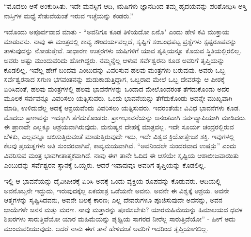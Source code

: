 “ಮೊದಲು ಆಸೆ ಅಂಕುರಿಸಿತು. ಇದೇ ಮನಸ್ಸಿಗೆ ಆದಿ, ಋಷಿಗಳು ಜ್ಞಾನದಿಂದ ತಮ್ಮ ಹೃದಯವನ್ನು ಪರಿಶೋಧಿಸಿ ಅಸ್ತಿ ನಾಸ್ತಿಗಳ ಮಧ್ಯೆ ಸೇತುವೆಯಂತೆ ಇರುವ ಇಚ್ಛೆಯನ್ನು ಕಂಡರು.”

ಇದೊಂದು ಅಪೂರ್ವವಾದ ಮಾತು - “ಅವನಿಗೂ ಕೂಡ ತಿಳಿಯದೋ ಏನೊ" ಎಂದು ಹೇಳಿ ಕವಿ ಮುಕ್ತಾಯ ಮಾಡುವನು. ನಾವು ಈ ಮಂತ್ರದಲ್ಲಿ ಕಾವ್ಯ ಸೌಂದರ್ಯವಲ್ಲದೆ, ಸೃಷ್ಟಿಗೆ ಸಂಬಂಧಪಟ್ಟ ಪ್ರಶ್ನೆಗಳು ಸ್ಪಷ್ಟರೂಪವನ್ನು ತಾಳುವುದನ್ನು ನೋಡುತ್ತೇವೆ. ಸಾಧಾರಣ ಉತ್ತರಗಳು ಋಷಿಗಳಿಗೆ ಯಾವ ತೃಪ್ತಿಯನ್ನೂ ಕೊಡುವ ಸ್ಥಿತಿಯಲ್ಲಿರಲಿಲ್ಲ. ಅವರು ಅಷ್ಟು ಮುಂದುವರಿದು ಹೋಗಿದ್ದರು. ನಮ್ಮನ್ನೆಲ್ಲ ಆಳುವ ಸರ್ವೆಶ್ವರನು ಕೂಡ ಅವರಿಗೆ ತೃಪ್ತಿಯನ್ನು ಕೊಡಲಿಲ್ಲ. ಇವೆಲ್ಲ ಹೇಗೆ ಬಂದವು ಎಂಬುದನ್ನು ವಿವರಿಸುವ ಹಲವು ಮಂತ್ರಗಳು ಬರುವುವು. ಅವರು ಒಬ್ಬ ಸರ್ವೆಶ್ವರನಾದ ಸಗುಣ ಭಗವಂತನನ್ನು ಹುಡುಕಾಡುತ್ತಿದ್ದಾಗ, ಒಬ್ಬರಾದ ಮೇಲೆ ಒಬ್ಬ ದೇವರನ್ನು ಆ ಪೀಠಕ್ಕೆ ಏರಿಸಿದಂತೆ, ಹಲವು ಮಂತ್ರಗಳಲ್ಲಿ ಹಲವು ಭಾವನೆಗಳನ್ನು ಒಂದಾದ ಮೇಲೊಂದರಂತೆ ತೆಗೆದುಕೊಂಡು ಅದರ ಮೂಲಕ ಸರ್ವವನ್ನೂ ವಿವರಿಸಲು ಯತ್ನಿಸುವರು. ಒಂದು ಭಾವನೆಯನ್ನು ತೆಗೆದುಕೊಂಡು ಅದನ್ನೇ ಮುಖ್ಯವಾಗಿ ಮಾಡಿ, ಉಳಿದುವೆಲ್ಲ ಅದಕ್ಕೆ ಆಶ್ರಯವೆಂದು ವಿವರಿಸಲು ಯತ್ನಿಸುವರು. ಇದರಂತೆಯೇ ವಿವಿಧ ಭಾವನೆಗಳು ಕೂಡ. ಮೊದಲು ಪ್ರಾಣವನ್ನು ಇದಕ್ಕಾಗಿ ತೆಗೆದುಕೊಂಡರು. ಪ್ರಾಣಭಾವನೆಯನ್ನು ಅನಂತವಾಗಿ ಸರ್ವವ್ಯಾಪಿಯಾಗಿ ಮಾಡಿದರು. ಈ ಪ್ರಾಣವೇ ಎಲ್ಲಕ್ಕೂ ಆಶ್ರಯವಾಗಿರುವುದು. ಮನುಷ್ಯನ ದೇಹಕ್ಕೆ ಮಾತ್ರವಲ್ಲ. ಇದೇ ಸೂರ್ಯ ಚಂದ್ರರಲ್ಲಿರುವ ಬೆಳಕು, ಎಲ್ಲವನ್ನೂ ಚಲಿಸುತ್ತಿರುವಂತೆ ಮಾಡುತ್ತಿರುವುದೇ ಇದು, ಇದೇ ವಿಶ್ವದ ಕ್ರಿಯೋತ್ತೇಜಕ ಶಕ್ತಿ. ಇವುಗಳಲ್ಲಿ ಕೆಲವು ಪ್ರಯತ್ನಗಳು ಅತಿ ಸುಂದರವಾಗಿವೆ, ಕಾವ್ಯಮಯವಾಗಿವೆ. “ಅವನಿಂದಲೇ ಸುಂದರವಾದ ಉಷಸ್ಸು” ಎಂದು ವಿವರಿಸುವ ಮಂತ್ರ ಭಾವಗೀತಾತ್ಮಕವಾಗಿದೆ. ನಾವು ಈಗ ತಾನೇ ಓದಿದ ಈ ಆಸೆಯೇ ಸೃಷ್ಟಿಯ ಆಶಾಬೀಜವಾಯಿತು ಎಂಬುದನ್ನು ಸರ್ವೆಶ್ವರನ ಸ್ಥಾನಕ್ಕೆ ಒಯ್ದರು. ಆದರೆ ಇವಾವುವೂ ಅವರಿಗೆ ತೃಪ್ತಿಯನ್ನು ಕೊಡಲಿಲ್ಲ.

ಇಲ್ಲಿ ಆ ಭಾವನೆಯನ್ನು ದೈವೀಪೀಠಕ್ಕೆ ಏರಿಸಿ ಅದಕ್ಕೆ ಒಂದು ವ್ಯಕ್ತಿಯ ರೂಪವನ್ನು ಕೊಡುವರು. ಆದಿಯಲ್ಲಿ ಅವನೊಬ್ಬನೇ ಇದ್ದುದು, ಇರುವುದಕ್ಕೆಲ್ಲ ಏಕಮಾತ್ರ ಒಡೆಯನೇ ಅವನು. ಅವನೇ ಈ ವಿಶ್ವಕ್ಕೆ ಆಶ್ರಯ. ಅವನೇ ಆತ್ಮಗಳನ್ನು ಸೃಷ್ಟಿಸಿದವನು, ಅವನೇ ಬಲಕ್ಕೆ ಕಾರಣ; ಎಲ್ಲ ದೇವರುಗಳೂ ಪೂಜಿಸುವುದೇ ಅವನನ್ನು, ಅವನ ಛಾಯೆಗಳೇ ಜನನ ಮತ್ತು ಮರಣ. ನಾವು ಮತ್ತಾರನ್ನು ಪೂಜಿಸಬೇಕು? ಯಾರ\break ಮಹಿಮೆಯನ್ನು ಹಿಮಾಲಯದ ಧವಳ ಶಿಖರಗಳು ಸಾರುತ್ತಿವೆಯೋ ಯಾರ ಮಹಿಮೆಯನ್ನು ಪೃಥ್ವಿಯ ಸಾಗರದ ನೀರೆಲ್ಲ ಸಾರುತ್ತಿದೆಯೋ'' - ಹೀಗೆ ಅದು ಮುಂದುವರಿಯುವುದು. ಆದರೆ ನಾನು ಈಗ ತಾನೆ ಹೇಳಿದಂತೆ ಅವರಿಗೆ ಇದರಿಂದ ತೃಪ್ತಿಯಾಗಲಿಲ್ಲ.


